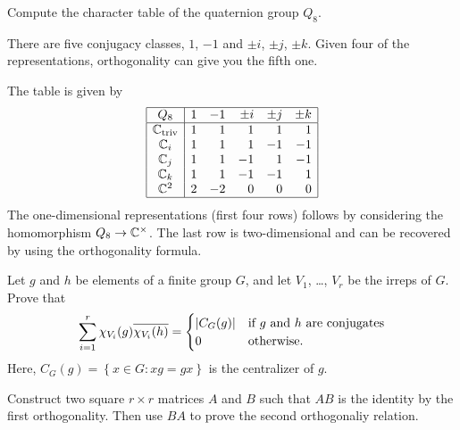 \begin{problem}
	[Quaternions]
	Compute the character table of the quaternion group $Q_8$.
	\begin{hint}
		There are five conjugacy classes, $1$, $-1$
		and $\pm i$, $\pm j$, $\pm k$.
		Given four of the representations, orthogonality
		can give you the fifth one.
	\end{hint}
	\begin{sol}
		The table is given by
		\[
			\begin{array}{|c|rrrrr|}
				\hline
				Q_8 & 1 & -1 & \pm i & \pm j & \pm k \\ \hline
				\mathbb C_{\mathrm{triv}} & 1 & 1 & 1 & 1 & 1 \\
				\mathbb C_i & 1 & 1 & 1 & -1 & -1 \\
				\mathbb C_j & 1 & 1 & -1 & 1 & -1 \\
				\mathbb C_k & 1 & 1 & -1 & -1 & 1 \\
				\mathbb C^2 & 2 & -2 & 0 & 0 & 0 \\\hline
			\end{array}
		\]
		The one-dimensional representations (first four rows)
		follows by considering the homomorphism $Q_8 \to \mathbb C^\times$.
		The last row is two-dimensional and can be recovered
		by using the orthogonality formula.
	\end{sol}
\end{problem}

\begin{sproblem}
	\label{prob:second_orthog}
	\onechili
	Let $g$ and $h$ be elements of a finite group $G$,
	and let $V_1$, \dots, $V_r$ be the irreps of $G$.
	Prove that
	\[
		\sum_{i = 1}^r \chi_{V_i}(g) \overline{\chi_{V_i}(h)}
		=
		\begin{cases}
			|C_G(g)| & \text{if $g$ and $h$ are conjugates} \\
			0 & \text{otherwise}.
		\end{cases}
	\]
	Here, $C_G(g) = \left\{ x \in G : xg = gx \right\}$
	is the centralizer of $g$.
	\begin{hint}
		Construct two square $r \times r$ matrices $A$ and $B$
		such that $AB$ is the identity by the first orthogonality.
		Then use $BA$ to prove the second orthogonaliy relation.
	\end{hint}
\end{sproblem}

